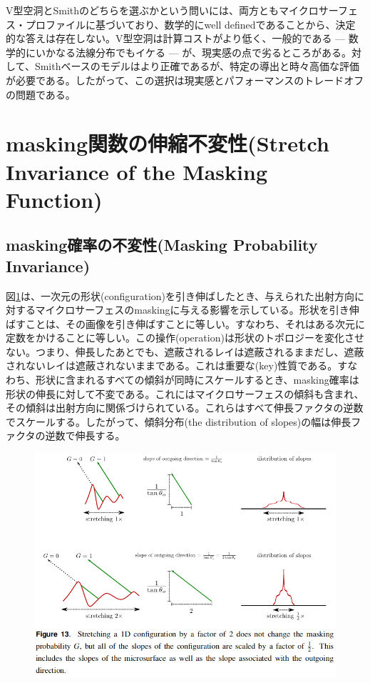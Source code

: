 \documentclass[a4j,xelatex,ja=standard]{bxjsarticle}
\begin{document}
V型空洞とSmithのどちらを選ぶかという問いには、両方ともマイクロサーフェス・プロファイルに基づいており、数学的にwell definedであることから、決定的な答えは存在しない。V型空洞は計算コストがより低く、一般的である --- 数学的にいかなる法線分布でもイケる --- が、現実感の点で劣るところがある。対して、Smithベースのモデルはより正確であるが、特定の導出と時々高価な評価が必要である。したがって、この選択は現実感とパフォーマンスのトレードオフの問題である。

\section{masking関数の伸縮不変性(Stretch Invariance of the Masking Function)}

\subsection{masking確率の不変性(Masking Probability Invariance)}

図\ref{fig:13}は、一次元の形状(configuration)を引き伸ばしたとき、与えられた出射方向に対するマイクロサーフェスのmaskingに与える影響を示している。形状を引き伸ばすことは、その画像を引き伸ばすことに等しい。すなわち、それはある次元に定数をかけることに等しい。この操作(operation)は形状のトポロジーを変化させない。つまり、伸長したあとでも、遮蔽されるレイは遮蔽されるままだし、遮蔽されないレイは遮蔽されないままである。これは重要な(key)性質である。すなわち、形状に含まれるすべての傾斜が同時にスケールするとき、masking確率は形状の伸長に対して不変である。これにはマイクロサーフェスの傾斜も含まれ、その傾斜は出射方向に関係づけられている。これらはすべて伸長ファクタの逆数でスケールする。したがって、傾斜分布(the distribution of slopes)の幅は伸長ファクタの逆数で伸長する。

\begin{figure}
    \includegraphics[width=\textwidth]{Figure13.png}
    \caption{}
    \label{fig:13}
\end{figure}
\end{document}
